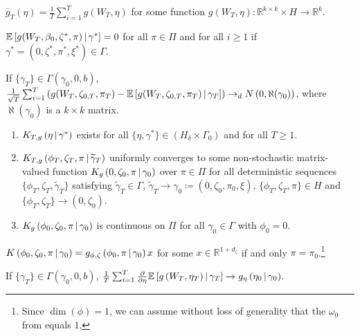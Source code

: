 \documentclass[11pt]{article}
\newcommand*{\R}{\mathbb{R}}
\newcommand*{\E}{\mathbb{E}}
\newcommand*{\N}{N}
\newcommand*{\dto}{\ensuremath{\to_d}}
\newcommand*{\Eta}{H}
\newcommand*{\popmom}{\ensuremath{g}}
\newcommand*{\sampmom}{\ensuremath{\overline{g}_T}}
\newcommand{\mvert}[1][\middle]{\ensuremath{\,#1\vert\,}}
\begin{document}
\begin{assump}[GMM 3]\label{ass:GMM3}
\begin{assumplist}
    \item $\sampmom(\eta) = \frac{1}{T} \sum_{i=1}^T \popmom(W_T, \eta)$  for some function $\popmom(W_T,
        \eta) : \R^{k \times k} \times \Eta \to \R^k$.
        \label{ass:GMM3a}
    \item $\E\left[\popmom(W_T, \beta_0, \zeta^{*}, \pi) \mvert \gamma^{*} \right] = 0$ for all $\pi \in \Pi$ and
        for all $i \geq 1$ if $\gamma^{*} = \left(0,\zeta^{*}, \pi^{*}, \xi^{*} \right) \in \Gamma$.
        \label{ass:GMM3b}
    \item If $\{ \gamma_T \} \in \Gamma(\gamma_0, 0, b)$, $\frac{1}{\sqrt{T}} \sum_{i=1}^T \left(g(W_T,
        \zeta_{0,T}, \pi_T) - \E \left[g(W_T, \zeta_{0,T}, \pi_T)\mvert \gamma_T \right]\right)  \dto \N\left(0,
        \aleph(\gamma_0)\right)$, where $\aleph(\gamma_0)$ is a $k \times k$ matrix.
        \label{ass:GMM3c}
    \item 
        \label{ass:GMM3d}
        \begin{enumerate}
            \item  $K_{T,g}\left(\eta \mvert \gamma^{*}\right)$ exists for all $\{\eta, \gamma^{*} \} \in
                \left(\Eta_{\delta} \times \Gamma_{0}\right)$ and for all $T \geq 1$.
            \item $K_{T,g}\left(\phi_T, \zeta_T, \pi \mvert \widetilde{\gamma}_T\right)$ uniformly converges to
                some non-stochastic matrix-valued function  $K_{g}\left(0, \zeta_0, \pi \mvert \gamma_0\right)$
                over $\pi \in \Pi$ for all deterministic sequences $\{\phi_T, \zeta_T, \widetilde{\gamma}_T \}$
                satisfying $\widetilde{\gamma}_T \in \Gamma$, $\widetilde{\gamma}_T \to \gamma_0 \coloneqq (0,
                \zeta_0, \pi_0, \xi)$, $\{\phi_T, \zeta_T, \pi \} \in \Eta$ and $\{\phi_T, \zeta_T \} \to (0,
                \zeta_0)$.
            \item $K_g\left(\phi_0, \zeta_0, \pi \mvert \gamma_0\right)$ is continuous on $\Pi$ for all  $\gamma_0
                \in \Gamma$ with $\phi_0 = 0$.
        \end{enumerate}
        \item $K\left(\phi_0, \zeta_0, \pi \mvert \gamma_0\right) = \popmom_{\phi, \zeta}\left(\phi_0, \pi\mvert
            \gamma_0\right) x$ for some $x \in \R^{1+d_{\zeta}}$ if and only $\pi = \pi_0$.\footnote{Since
                $\dim(\phi) = 1$, we can assume without loss of generality that the $\omega_0$ from
            \textcite{andrewsGmm2014} equals $1$.}
        \label{ass:GMM3e}
        \item If $\{ \gamma_T \} \in \Gamma(\gamma_0, 0, b)$, $\frac{1}{T} \sum_{i=1}^T \frac{\partial}{\partial
            \eta}  \E\left[ \popmom\left(W_T, \eta_T \right ) \mvert \gamma_T \right] \to
            \popmom_{\eta}\left(\eta_0 \mvert \gamma_0\right)$.
        \label{ass:GMM3f}
\end{assumplist}
\end{assump}
\end{document}
